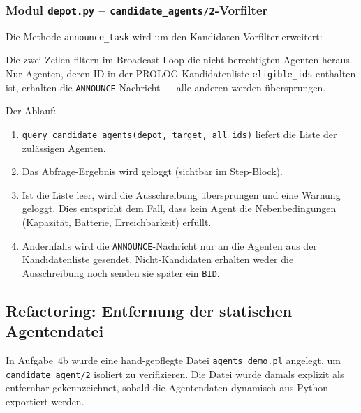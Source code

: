 \subsubsection{Modul \texttt{depot.py} – \texttt{candidate\_agents/2}-Vorfilter}

Die Methode \texttt{announce\_task} wird um den Kandidaten-Vorfilter erweitert:





Die zwei Zeilen filtern im Broadcast-Loop die nicht-berechtigten Agenten heraus. Nur Agenten, deren ID in der \acs{PROLOG}-Kandidatenliste \texttt{eligible\_ids} enthalten ist, erhalten die \texttt{ANNOUNCE}-Nachricht — alle anderen werden übersprungen.

Der Ablauf:
\begin{enumerate}
    \item \texttt{query\_candidate\_agents(depot, target, all\_ids)} liefert die Liste der zulässigen Agenten.
    \item Das Abfrage-Ergebnis wird geloggt (sichtbar im Step-Block).
    \item Ist die Liste leer, wird die Ausschreibung übersprungen und eine Warnung geloggt. Dies entspricht dem Fall, dass kein Agent die Nebenbedingungen (Kapazität, Batterie, Erreichbarkeit) erfüllt.
    \item Andernfalls wird die \texttt{ANNOUNCE}-Nachricht nur an die Agenten aus der Kandidatenliste gesendet. Nicht-Kandidaten erhalten weder die Ausschreibung noch senden sie später ein \texttt{BID}.
\end{enumerate}


\subsection{Refactoring: Entfernung der statischen Agentendatei}

In Aufgabe~4b wurde eine hand-gepflegte Datei \texttt{agents\_demo.pl} angelegt, um \\ \texttt{candidate\_agent/2} isoliert zu verifizieren. Die Datei wurde damals explizit als entfernbar gekennzeichnet, sobald die Agentendaten dynamisch aus Python exportiert werden.

